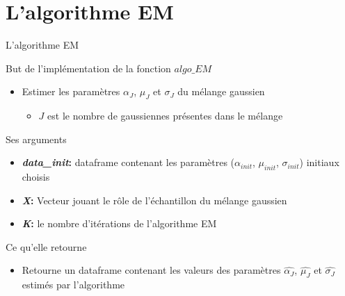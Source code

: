 \documentclass[11pt]{beamer}
\begin{document}
	\section{L'algorithme EM}
	\begin{frame}{L'algorithme EM}
		\begin{block}{\scriptsize But de l'implémentation de la fonction $algo\_EM$}
			\begin{itemize}
				\scriptsize
				\item Estimer les paramètres $\alpha_J$, $\mu_J$ et $\sigma_J$ du mélange gaussien
				\begin{itemize}
					\scriptsize
					\item $J$ est le nombre de gaussiennes présentes dans le mélange
				\end{itemize}
			\end{itemize}
		\end{block}
		\begin{block}{ \scriptsize Ses arguments}
			\begin{itemize}
				\scriptsize
				\item \textbf{\textit{data\_init}:} dataframe contenant les paramètres ($\alpha_{init}$, $\mu_{init}$, $\sigma_{init}$) initiaux choisis \\
				\item \textbf{\textit{X}:} Vecteur jouant le rôle de l'échantillon du mélange gaussien  \\
				\item \textbf{\textit{K}:} le nombre d'itérations de l'algorithme EM
			\end{itemize}
		\end{block}
		\begin{block}{\scriptsize Ce qu'elle retourne}
			\scriptsize
			\begin{itemize}
				\item Retourne un dataframe contenant les valeurs des paramètres $\widehat{\alpha_J}$, $\widehat{\mu_J}$ et $\widehat{\sigma_J}$ estimés par l'algorithme
			\end{itemize}
		\end{block}
	\end{frame}
\end{document}

